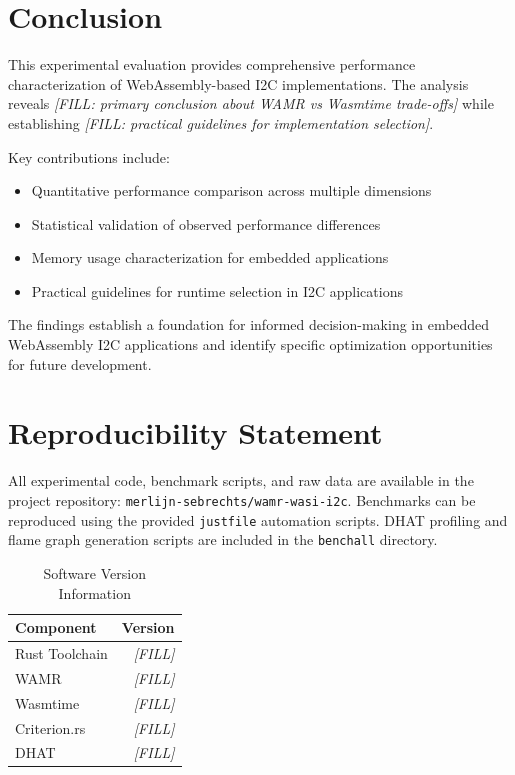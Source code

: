 \section{Conclusion}
\label{sec:eval-conclusion}

This experimental evaluation provides comprehensive performance characterization of WebAssembly-based I2C implementations. The analysis reveals \textit{[FILL: primary conclusion about WAMR vs Wasmtime trade-offs]} while establishing \textit{[FILL: practical guidelines for implementation selection]}.

Key contributions include:
\begin{itemize}
    \item Quantitative performance comparison across multiple dimensions
    \item Statistical validation of observed performance differences  
    \item Memory usage characterization for embedded applications
    \item Practical guidelines for runtime selection in I2C applications
\end{itemize}

The findings establish a foundation for informed decision-making in embedded WebAssembly I2C applications and identify specific optimization opportunities for future development.

\section*{Reproducibility Statement}
\label{sec:reproducibility}

All experimental code, benchmark scripts, and raw data are available in the project repository: \texttt{merlijn-sebrechts/wamr-wasi-i2c}. Benchmarks can be reproduced using the provided \texttt{justfile} automation scripts. DHAT profiling and flame graph generation scripts are included in the \texttt{benchall} directory.

\begin{table}[htbp]
\centering
\caption{Software Version Information}
\label{tab:software-versions}
\begin{tabular}{lr}
\toprule
\textbf{Component} & \textbf{Version} \\
\midrule
Rust Toolchain     & \textit{[FILL]} \\
WAMR               & \textit{[FILL]} \\
Wasmtime           & \textit{[FILL]} \\
Criterion.rs       & \textit{[FILL]} \\
DHAT               & \textit{[FILL]} \\
\bottomrule
\end{tabular}
\end{table}